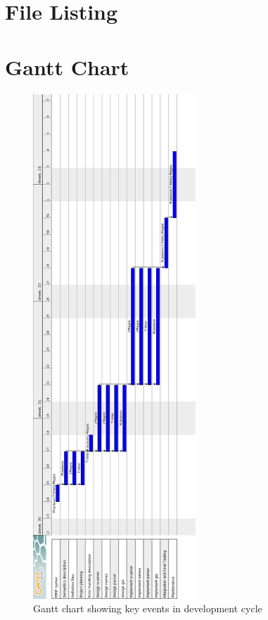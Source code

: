 \documentclass[a4paper,10pt]{article}
\begin{document}
\pagebreak

\section{File Listing}

\pagebreak
\section{Gantt Chart}
\begin{figure}[h]
 \centering
  \includegraphics[height=19cm]{Gantt-Chart.png}
 \caption{Gantt chart showing key events in development cycle}
 \label{fig:ganttchart}
\end{figure}
\pagebreak
\end{document}
